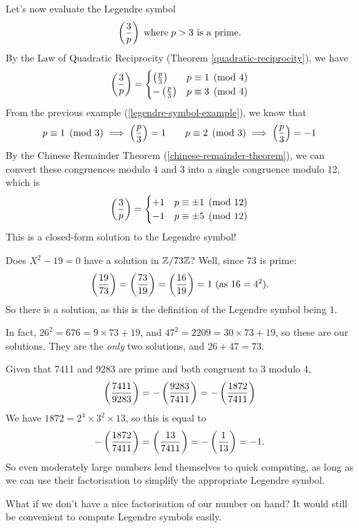 \documentclass{article}
\begin{document}
\begin{example}
    Let's now evaluate the Legendre symbol
    \[
	\left( \frac{3}{p} \right) \mathrel{\, \text{where}} p>3 \text{ is a prime.}
	\]
	By the Law of Quadratic Reciprocity (Theorem \ref{quadratic-reciprocity}), we have
	\[
	\left( \frac{3}{p} \right) = \begin{cases}
		\left( \frac{p}{3} \right) & p \equiv 1 \pmod{4} \\
		- \left( \frac{p}{3} \right) & p \equiv 3 \pmod{4}
	\end{cases}
	\]
	From the previous example (\ref{legendre-symbol-example}), we know that
	\[
	p \equiv 1 \pmod{3} \implies \left( \frac{p}{3} \right) = 1 \qquad p \equiv 2 \pmod{3} \implies \left( \frac{p}{3} \right) = -1
	\]
	By the Chinese Remainder Theorem (\ref{chinese-remainder-theorem}), we can convert these congruences modulo 4 and 3 into a single congruence modulo 12, which is
	\[
	\left( \frac{3}{p} \right) = \begin{cases}
		+1 & p \equiv \pm 1 \pmod{12} \\
		-1 & p \equiv \pm 5 \pmod{12}
	\end{cases}
	\]
	This is a closed-form solution to the Legendre symbol!
\end{example}

\begin{example}
    Does $X^2 - 19 = 0$ have a solution in $\mathbb{Z}/73\mathbb{Z}$? Well, since 73 is prime:
    \[
	\left( \frac{19}{73} \right) = \left( \frac{73}{19} \right) = \left( \frac{16}{19} \right) = 1 \text{ (as } 16 = 4^2).
	\]
	So there is a solution, as this is the definition of the Legendre symbol being 1.
	
	In fact, $26^2 = 676 = 9 \times 73 + 19$, and $47^2 = 2209 = 30 \times 73 + 19$, so these are our solutions. They are the \textit{only} two solutions, and $26 + 47 = 73$.
\end{example}

\begin{example}
	Given that 7411 and 9283 are prime and both congruent to 3 modulo 4,
    \[
	\left( \frac{7411}{9283} \right) = -\left( \frac{9283}{7411} \right) = - \left( \frac{1872}{7411} \right)
	\]
	We have $1872 = 2^4 \times 3^2 \times 13$, so this is equal to
	\[
	- \left( \frac{1872}{7411} \right) = \left( \frac{13}{7411} \right) = - \left( \frac{1}{13} \right) = -1.
	\]
	So even moderately large numbers lend themselves to quick computing, as long as we can use their factorisation to simplify the appropriate Legendre symbol.
\end{example}

What if we don't have a nice factorisation of our number on hand? It would still be convenient to compute Legendre symbols easily.
\end{document}
